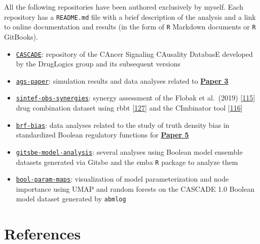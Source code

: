 \documentclass[
  12pt,
]{book}
\providecommand{\tightlist}{%
  \setlength{\itemsep}{0pt}\setlength{\parskip}{0pt}}
\begin{document}
All the following repositories have been authored exclusively by myself.
Each repository has a \texttt{README.md} file with a brief description of the analysis and a link to online documentation and results (in the form of \texttt{R} Markdown documents or \texttt{R} GitBooks).

\begin{itemize}
\tightlist
\item
  \href{https://github.com/druglogics/cascade}{\texttt{CASCADE}}: repository of the CAncer Signaling CAusality DatabasE developed by the DrugLogics group and its subsequent versions
\item
  \href{https://github.com/druglogics/ags-paper}{\texttt{ags-paper}}: simulation results and data analyses related to \textbf{\protect\hyperlink{Paper3}{Paper 3}}
\item
  \href{https://github.com/druglogics/sintef-obs-synergies}{\texttt{sintef-obs-synergies}}: synergy assessment of the Flobak et al.~(2019) {[}\protect\hyperlink{ref-Flobak2019}{115}{]} drug combination dataset using rbbt {[}\protect\hyperlink{ref-Vazquez2010}{127}{]} and the CImbinator tool {[}\protect\hyperlink{ref-Flobak2017}{116}{]}
\item
  \href{https://github.com/druglogics/brf-bias}{\texttt{brf-bias}}: data analyses related to the study of truth density bias in standardized Boolean regulatory functions for \textbf{\protect\hyperlink{Paper5}{Paper 5}}
\item
  \href{https://github.com/druglogics/gitsbe-model-analysis}{\texttt{gitsbe-model-analysis}}: several analyses using Boolean model ensemble datasets generated via Gitsbe and the emba \texttt{R} package to analyze them
\item
  \href{https://github.com/druglogics/bool-param-maps}{\texttt{bool-param-maps}}: visualization of model parameterization and node importance using UMAP and random forests on the CASCADE 1.0 Boolean model dataset generated by \texttt{abmlog}
\end{itemize}

\hypertarget{references}{%
\chapter*{References}\label{references}}
\end{document}
